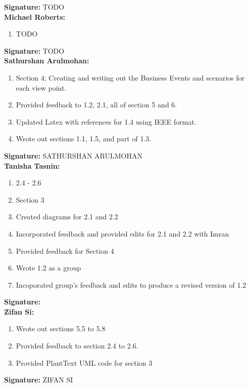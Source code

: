 \documentclass[]{article}
\begin{document}
\textbf{Signature:} TODO \\

\textbf{Michael Roberts:}
\begin{enumerate}
	\item TODO
\end{enumerate}

\textbf{Signature:} TODO \\

\textbf{Sathurshan Arulmohan:}
\begin{enumerate}
	\item Section 4; Creating and writing out the Business Events and scenarios for each view point.
	\item Provided feedback to 1.2, 2.1, all of section 5 and 6.
	\item Updated Latex with references for 1.4 using IEEE format.
	\item Wrote out sections 1.1, 1.5, and part of 1.3.
\end{enumerate}

\textbf{Signature:} SATHURSHAN ARULMOHAN \\

\textbf{Tanisha Tasnin:}
\begin{enumerate}
	\item 2.4 - 2.6
	\item Section 3
	\item Created diagrams for 2.1 and 2.2
	\item Incorporated feedback and provided edits for 2.1 and 2.2 with Imran
	\item Provided feedback for Section 4
	\item Wrote 1.2 as a group
	\item Incoporated group's feedback and edits to produce a revised version of 1.2
\end{enumerate}

\textbf{Signature:} \\

\textbf{Zifan Si:}
\begin{enumerate}
	\item Wrote out sections 5.5 to 5.8
	\item Provided feedback to section 2.4 to 2.6.
	\item Provided PlantText UML code for section 3
\end{enumerate}

\textbf{Signature:} ZIFAN SI  \\

\end{document}
